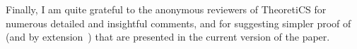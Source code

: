 \documentclass{article}
\begin{document}
 Finally, I am quite grateful to the anonymous reviewers of TheoretiCS for numerous detailed and insightful comments, and for suggesting simpler proof of~ (and by extension~) that are 
 presented in the current version of the paper. 

%
%

\end{document}
